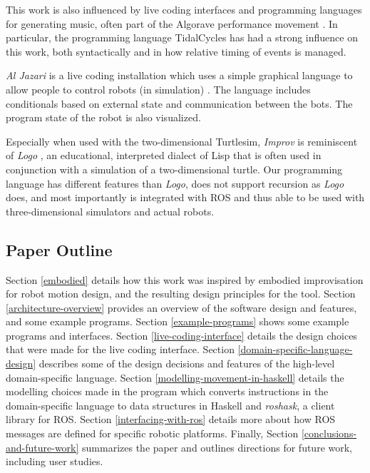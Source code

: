 \documentclass[sigconf]{acmart}
\begin{document}
This work is also influenced by live coding interfaces and programming languages
for generating music, often part of the Algorave performance movement
\cite{collins2014algorave}. In particular, the programming language TidalCycles
\cite{mclean2010tidal} has had a strong influence on this work, both
syntactically and in how relative timing of events is managed.

\emph{Al Jazari} is a live coding installation which uses a simple graphical
language to allow people to control robots (in simulation)
\cite{mclean2010visualisation}. The language includes conditionals based on
external state and communication between the bots. The program state of the
robot is also visualized.

Especially when used with the two-dimensional Turtlesim, \emph{Improv}
is reminiscent of \emph{Logo} \cite{logo}, an educational, interpreted
dialect of Lisp that is often used in conjunction with a simulation of a
two-dimensional turtle. Our programming language has different features
than \emph{Logo}, does not support recursion as \emph{Logo} does, and
most importantly is integrated with ROS and thus able to be used with
three-dimensional simulators and actual robots.

\subsection{Paper Outline}

Section \ref{embodied} details how this work was inspired by embodied
improvisation for robot motion design, and the resulting design principles for
the tool.
Section
\ref{architecture-overview} provides an overview of the software design and
features, and some example programs. Section \ref{example-programs} shows some example programs and
interfaces. Section \ref{live-coding-interface} details the design choices that
were made for the live coding interface. Section
\ref{domain-specific-language-design} describes some of the design decisions and
features of the high-level domain-specific language. Section
\ref{modelling-movement-in-haskell} details the modelling choices made in the
program which converts instructions in the domain-specific language to data
structures in Haskell and \emph{roshask}, a client library for ROS.
Section \ref{interfacing-with-ros} details more about how ROS messages are
defined for specific robotic platforms. Finally, Section
\ref{conclusions-and-future-work} summarizes the paper and outlines directions
for future work, including user studies.
\end{document}
